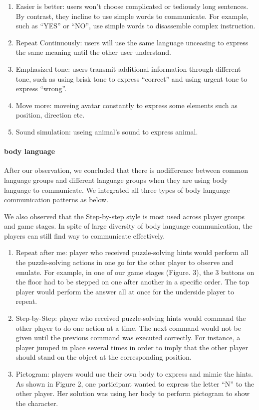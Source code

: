 \begin{enumerate}
  \item Easier is better: users won't choose complicated or tediously long sentences. By contrast, they incline to use simple words to communicate. For example, such as ``YES'' or ``NO'', use simple words to disassemble complex instruction.

  \item Repeat Continuously: users will use the same language unceasing to express the same meaning until the other user understand.
  
  \item Emphasized tone: users transmit additional information through different tone, such as using brisk tone to express ``correct'' and using urgent tone to express ``wrong''.
  
  \item Move more: moveing avatar constantly to express some elements such as position, direction etc.
  
  \item Sound simulation: useing animal's sound to express animal.
\end{enumerate}

\paragraph{body language}
After our observation, we concluded that there is nodifference between common language groups and different language groups when they are using body language to communicate. We integrated all three types of body language communication patterns as below. 

We also observed that the Step-by-step style is most used across player groups and game stages. In spite of large diversity of body language communication, the players can still find way to communicate effectively.

\begin{enumerate}
  \item Repeat after me: player who received puzzle-solving hints would perform all the puzzle-solving actions in one go for the other player to observe and emulate. For example, in one of our game stages (Figure. 3), the 3 buttons on the floor had to be stepped on one after another in a specific order. The top player would perform the answer all at once for the underside player to repeat. 
 
  \item Step-by-Step: player who received puzzle-solving hints would command the other player to do one action at a time. The next command would not be given until the previous command was executed correctly. For instance, a player jumped in place several times in order to imply that the other player should stand on the object at the corresponding position.
                                  
  \item Pictogram: players would use their own body to express and mimic the hints. As shown in Figure 2, one participant wanted to express the letter “N” to the other player. Her solution was using her body to perform pictogram to show the character.
\end{enumerate}

